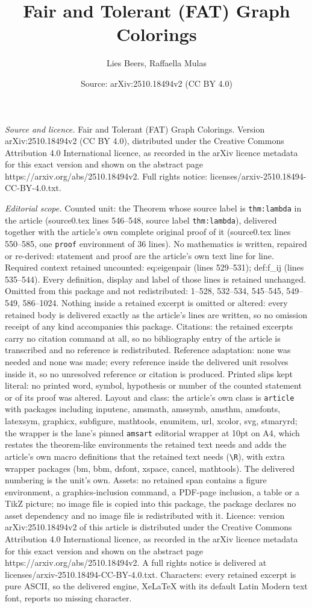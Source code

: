 \documentclass[10pt,a4paper]{amsart}
\title[Fair and Tolerant (FAT) Graph Colorings]{Fair and Tolerant (FAT) Graph Colorings}
\author{Lies Beers, Raffaella Mulas}
\date{Source: arXiv:2510.18494v2 (CC BY 4.0)}
\begin{document}
\maketitle

\noindent\emph{Source and licence.} Fair and Tolerant (FAT) Graph Colorings. Version arXiv:2510.18494v2 (CC BY 4.0), distributed under the Creative Commons Attribution 4.0 International licence, as recorded in the arXiv licence metadata for this exact version and shown on the abstract page https://arxiv.org/abs/2510.18494v2. Full rights notice: licenses/arxiv-2510.18494-CC-BY-4.0.txt.\par\smallskip

\noindent\textit{Editorial scope.} Counted unit: the Theorem whose source label is \texttt{thm:lambda} in the article (source0.tex lines 546--548, source label \texttt{thm:lambda}), delivered together with the article's own complete original proof of it (source0.tex lines 550--585, one \texttt{proof} environment of 36 lines). No mathematics is written, repaired or re-derived: statement and proof are the article's own text line for line. Required context retained uncounted: eq:eigenpair (lines 529--531); def:f\_ij (lines 535--544). Every definition, display and label of those lines is retained unchanged. Omitted from this package and not redistributed: 1--528, 532--534, 545--545, 549--549, 586--1024. Nothing inside a retained excerpt is omitted or altered: every retained body is delivered exactly as the article's lines are written, so no omission receipt of any kind accompanies this package. Citations: the retained excerpts carry no citation command at all, so no bibliography entry of the article is transcribed and no reference is redistributed. Reference adaptation: none was needed and none was made; every reference inside the delivered unit resolves inside it, so no unresolved reference or citation is produced. Printed slips kept literal: no printed word, symbol, hypothesis or number of the counted statement or of its proof was altered. Layout and class: the article's own class is \texttt{article} with packages including inputenc, amsmath, amssymb, amsthm, amsfonts, latexsym, graphicx, subfigure, mathtools, enumitem, url, xcolor, svg, stmaryrd; the wrapper is the lane's pinned \texttt{amsart} editorial wrapper at 10pt on A4, which restates the theorem-like environments the retained text needs and adds the article's own macro definitions that the retained text needs (\texttt{\textbackslash R}), with extra wrapper packages (bm, bbm, dsfont, xspace, cancel, mathtools). The delivered numbering is the unit's own. Assets: no retained span contains a figure environment, a graphics-inclusion command, a PDF-page inclusion, a table or a TikZ picture; no image file is copied into this package, the package declares no asset dependency and no image file is redistributed with it. Licence: version arXiv:2510.18494v2 of this article is distributed under the Creative Commons Attribution 4.0 International licence, as recorded in the arXiv licence metadata for this exact version and shown on the abstract page https://arxiv.org/abs/2510.18494v2. A full rights notice is delivered at licenses/arxiv-2510.18494-CC-BY-4.0.txt. Characters: every retained excerpt is pure ASCII, so the delivered engine, XeLaTeX with its default Latin Modern text font, reports no missing character.
\end{document}
